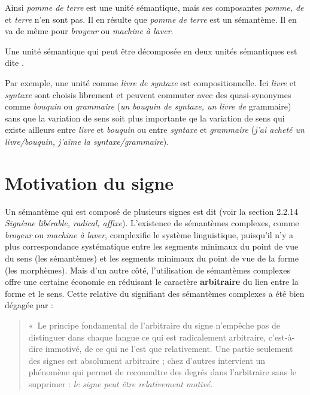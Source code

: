 Ainsi \textit{pomme de terre} est une unité sémantique, mais ses composantes \textit{pomme, de} et \textit{terre} n’en sont pas. Il en résulte que \textit{pomme de terre} est un sémantème. Il en va de même pour \textit{broyeur} ou \textit{machine à laver}.

\begin{styleLivreImportant}
Une unité sémantique qui peut être décomposée en deux unités sémantiques est dite .
\end{styleLivreImportant}

Par exemple, une unité comme \textit{livre de syntaxe} est compositionnelle. Ici \textit{livre} et \textit{syntaxe} sont choisis librement et peuvent commuter avec des quasi-synonymes comme \textit{bouquin} ou \textit{grammaire} (\textit{un bouquin de syntaxe, un livre de} grammaire) sans que la variation de sens soit plus importante qe la variation de sens qui existe ailleurs entre \textit{livre} et \textit{bouquin} ou entre \textit{syntaxe} et \textit{grammaire} (\textit{j’ai acheté un livre/bouquin, j’aime la syntaxe/grammaire}).

\section{Motivation du signe}\label{sec:2.3.2}

Un sémantème qui est composé de plusieurs signes est dit  (voir la section\textstyleTermesapprofondissement{} 2.2.14 \textit{Signème libérable, radical, affixe}). L’existence de sémantèmes complexes, comme \textit{broyeur} ou \textit{machine à laver}, complexifie le système linguistique, puisqu’il n’y a plus correspondance systématique entre les segments minimaux du point de vue du sens (les sémantèmes) et les segments minimaux du point de vue de la forme (les morphèmes). Mais d’un autre côté, l’utilisation de sémantèmes complexes offre une certaine économie en réduisant le caractère \textbf{arbitraire} du lien entre la forme et le sens. Cette relative  du signifiant des sémantèmes complexes a été bien dégagée par \citet[180]{Saussure1916} :

\begin{quote}
    «~Le principe fondamental de l’arbitraire du signe n’empêche pas de distinguer dans chaque langue ce qui est radicalement arbitraire, c’est-à-dire immotivé, de ce qui ne l’est que relativement. Une partie seulement des signes est absolument arbitraire ; chez d’autres intervient un phénomène qui permet de reconnaître des degrés dans l’arbitraire sans le supprimer : \textit{le signe peut être relativement motivé}.
\end{quote}

